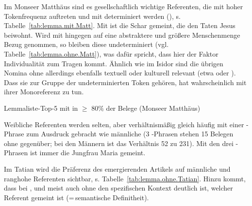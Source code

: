 

Im Monseer Matthäus sind es gesellschaftlich wichtige Referenten, die mit hoher Tokenfrequenz auftreten und mit  determiniert werden (), s. Tabelle~\ref{tab:lemma.mit.Matt}. Mit  ist die Schar gemeint, die den Taten Jesus beiwohnt. Wird mit  hingegen auf eine abstraktere und größere Menschenmenge Bezug genommen, so bleiben diese undeterminiert (vgl. Tabelle~\ref{tab:lemma.ohne.Matt}), was dafür spricht, dass hier der Faktor Individualität zum Tragen kommt. Ähnlich wie im Isidor sind die übrigen Nomina ohne  allerdings ebenfalls textuell  oder kulturell  relevant (etwa  oder ).  Dass sie zur Gruppe der undeterminierten Token gehören, hat wahrscheinlich mit ihrer Monoreferenz zu tun. 

  \begin{table}
      \resizebox{\textwidth}{!}{}
      \caption{Lemmaliste-Top-5 mit  in $\geq$ 80\% der Belege (Monseer Matthäus)\label{tab:lemma.mit.Matt}}
  \end{table}

Weibliche Referenten werden selten, aber verhältnismäßig gleich häufig mit einer -Phrase zum Ausdruck gebracht wie männliche (3 -Phrasen stehen 15 Belegen ohne  gegenüber; bei den Männern ist das Verhältnis 52 zu 231). Mit den drei -Phrasen ist immer die Jungfrau Maria gemeint. 


Im Tatian wird die Präferenz des emergierenden Artikels auf männliche und ranghohe Referenten  sichtbar, s. Tabelle~\ref{tab:lemma.ohne.Tatian}. Hinzu kommt, dass bei ,  und  meist auch ohne den spezifischen Kontext deutlich ist, welcher Referent gemeint ist (=\,semantische Definitheit).

